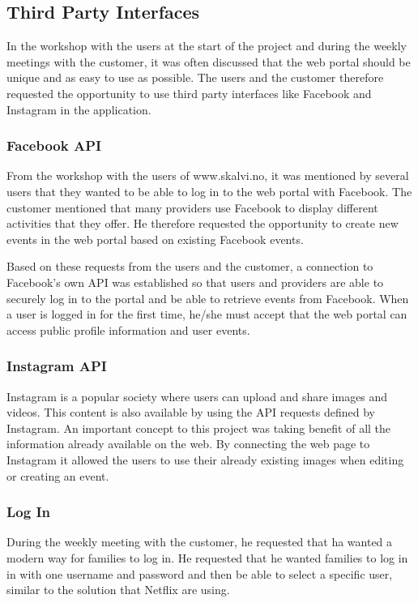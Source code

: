 \subsection{Third Party Interfaces}
In the workshop with the users at the start of the project and during the weekly meetings with the customer, it was often discussed that the web portal should be unique and as easy to use as possible. The users and the customer therefore requested the opportunity to use third party interfaces like Facebook and Instagram in the application. 

\subsubsection{Facebook API}
From the workshop with the users of www.skalvi.no, it was mentioned by several users that they wanted to be able to log in to the web portal with Facebook.
The customer mentioned that many providers use Facebook to display different activities that they offer. He therefore requested the opportunity to create new events in the web portal based on existing Facebook events.  

Based on these requests from the users and the customer, a connection to Facebook's own API was established so that users and providers are able to securely log in to the portal and be able to retrieve events from Facebook. When a user is logged in for the first time, he/she must accept that the web portal can access public profile information and user events.

\subsubsection{Instagram API}
Instagram is a popular society where users can upload and share images and videos. This content is also available by using the API requests defined by Instagram.
An important concept to this project was taking benefit of all the information already available on the web. By connecting the web page to Instagram it allowed the users to use their already existing images when editing or creating an event. 

\subsubsection{Log In}
During the weekly meeting with the customer, he requested that ha wanted a modern way for families to log in. He requested that he wanted families to log in in with one username and password and then be able to select a specific user, similar to the solution that Netflix are using. 

